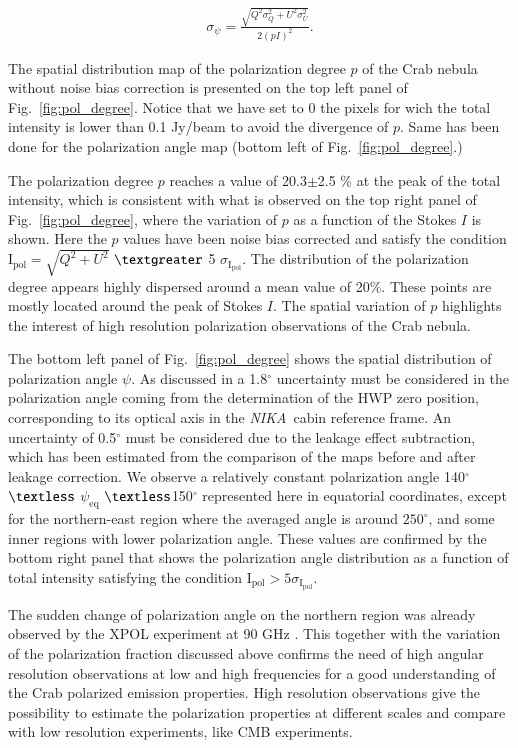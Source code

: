 \documentclass[twocolumn,traditabstract]{aa}
\def\NIKA{\textit{NIKA}}
\begin{document}
  \begin{eqnarray}\label{angle_uncertainty}
  \sigma_{\psi} = \frac{\sqrt{Q^2\sigma_Q^2 + U^2\sigma_U^2}}{2(pI)^2}.
  \end{eqnarray}

The spatial distribution map of the polarization degree $p$ of the Crab nebula
without noise bias correction is presented on the top left panel of
Fig.~\ref{fig:pol_degree}. Notice that we have set to 0 the pixels for wich the total intensity is lower than 0.1 Jy/beam to avoid the divergence of $p$. Same has been done for the polarization angle map (bottom left of Fig.~\ref{fig:pol_degree}.)

The polarization degree $p$ reaches a value of 20.3$\pm$2.5 \% at
the peak of the total intensity, which is consistent with what is observed on the
top right panel of Fig.~\ref{fig:pol_degree}, where the variation of $p$ as a
function of the Stokes $I$ is shown.  Here the $p$ values have been noise bias
corrected and satisfy the condition $\textrm{I}_{\textrm{pol}}=\sqrt{Q^2+U^2}$ $\textgreater$ 5
$\sigma_{\textrm{I}_{\textrm{pol}}}$. The distribution of the polarization degree appears highly
dispersed around a mean value of 20\%. These points are mostly located around the peak of Stokes $I$. 
The spatial variation of $p$ highlights the interest of high resolution polarization
observations of the Crab nebula. 

The bottom left panel of Fig.~\ref{fig:pol_degree} shows the spatial distribution of polarization angle
$\psi$. As discussed in \cite{ritacco2017} a 1.8$^{\circ}$ uncertainty must be considered in the polarization angle coming from the determination of the HWP zero position, corresponding to its optical axis in the \NIKA\ cabin reference frame. An uncertainty of 0.5$^{\circ}$ must be considered due to the leakage effect subtraction, which has been estimated from the comparison of the maps before and after leakage correction. We observe a relatively constant polarization
angle 140$^{\circ}$ $\textless$ $\psi_{\textrm{eq}}$ $\textless$150$^{\circ}$ represented here in equatorial coordinates, except
for the northern-east region where the averaged angle is around $250^{\circ}$, and
some inner regions with lower polarization angle.  These values are confirmed by
the bottom right panel that shows the polarization angle distribution as a
function of total intensity satisfying the condition ${\textrm{I}_{\textrm{pol}}} > 5\sigma_{{\textrm{I}_{\textrm{pol}}}}$.

The sudden change of polarization angle on the northern region was already
observed by the XPOL experiment at 90 GHz \citep{aumont2010}.  This together
with the variation of the polarization fraction discussed above confirms the
need of high angular resolution observations at low and high frequencies for a
good understanding of the Crab polarized emission properties.
High resolution observations give the possibility to estimate the polarization properties at different scales and compare with low resolution experiments, like CMB experiments.
\end{document}
